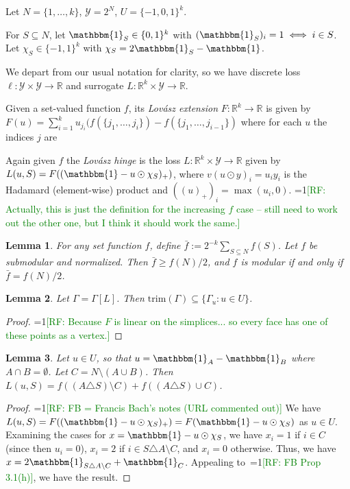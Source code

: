 \documentclass{article}
\newcommand{\Comments}{1}
\newcommand{\mynote}[2]{\ifnum\Comments=1\textcolor{#1}{#2}\fi}
\newcommand{\raf}[1]{\mynote{green}{[RF: #1]}}
\newcommand{\reals}{\mathbb{R}}
\newcommand{\prop}[1]{\Gamma[#1]}
\newcommand{\Y}{\mathcal{Y}}
\newcommand{\trim}{\mathrm{trim}}
\newcommand{\ones}{\mathbbm{1}}
\newtheorem{lemma}{Lemma}
\begin{document}
Let $N = \{1,\ldots,k\}$, $\Y = 2^N$, $U = \{-1,0,1\}^k$.

For $S\subseteq N$, let $\ones_S \in \{0,1\}^k$ with $(\ones_S)_i = 1 \iff i\in S$.
Let $\chi_S \in \{-1,1\}^k$ with $\chi_S = 2\ones_S - \ones$.

We depart from our usual notation for clarity, so we have discrete loss $\ell : \Y \times \Y \to \reals$ and surrogate $L : \reals^k \times \Y \to \reals$.

Given a set-valued function $f$, its \emph{Lov\'asz extension} $F:\reals^k\to\reals$ is given by
$F(u) = \sum_{i=1}^k u_{j_i} (f(\{j_1,\ldots,j_i\}) - f(\{j_1,\ldots,j_{i-1}\})$ where for each $u$ the indices $j$ are 

Again given $f$ the \emph{Lov\'asz hinge} is the loss $L:\reals^k\times\Y\to\reals$ given by $L(u,S) = F((\ones - u \odot \chi_S)_+)$, where $v (u \odot y)_i = u_iy_i$ is the Hadamard (element-wise) product and $((u)_+)_i = \max(u_i,0)$.
\raf{Actually, this is just the definition for the increasing $f$ case -- still need to work out the other one, but I think it should work the same.}

\begin{lemma}
  \label{lem:bar-f}
  For any set function $f$, define $\bar f := 2^{-k} \sum_{S\subseteq N} f(S)$.
  Let $f$ be submodular and normalized.
  Then $\bar f \geq f(N)/2$, and $f$ is modular if and only if $\bar f = f(N)/2$.
\end{lemma}

\begin{lemma}
  \label{lem:lovasz-trim}
  Let $\Gamma = \prop{L}$.
  Then $\trim(\Gamma) \subseteq \{\Gamma_u : u \in U\}$.
\end{lemma}
\begin{proof}
  \raf{Because $F$ is linear on the simplices... so every face has one of these points as a vertex.}
\end{proof}

\begin{lemma}
  \label{lem:lovasz-u}
  Let $u\in U$, so that $u = \ones_A - \ones_B$ where $A\cap B = \emptyset$.
  Let $C = N \setminus (A\cup B)$.
  Then $L(u,S) = f((A\triangle S)\setminus C) + f((A\triangle S)\cup C)$.
\end{lemma}
\begin{proof}
  \raf{FB = Francis Bach's notes (URL commented out)}%
  We have $L(u,S) = F((\ones - u\odot\chi_S)_+) = F(\ones - u\odot\chi_S)$ as $u\in U$.
  Examining the cases for $x = \ones - u\odot\chi_S$, we have $x_i = 1$ if $i \in C$ (since then $u_i = 0$), $x_i = 2$ if $i \in S \triangle A \setminus C$, and $x_i = 0$ otherwise.
  Thus, we have $x = 2\ones_{S \triangle A \setminus C} + \ones_C$.
  Appealing to~\raf{FB Prop 3.1(h)}, we have the result.
\end{proof}
\end{document}
